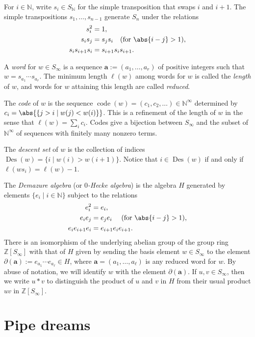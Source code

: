 \documentclass[11pt,reqno]{amsart} %
\newcommand{\bbN}{\mathbb{N}}
\newcommand{\bbZ}{\mathbb{Z}}
\DeclareMathOperator{\code}{code}
\DeclareMathOperator{\Des}{Des}
\theoremstyle{definition}
\begin{document}
For $i\in \bbN$, write $s_i\in S_\bbN$ for the simple transposition that swaps $i$ and $i+1$.
The simple transpositions $s_1,\dots,s_{n-1}$ generate $S_n$ under the relations \begin{align*}
    s_i^2 &= 1, \\
    s_is_j &= s_js_i
    \quad\text{(for $\abs{i-j}>1$)},
    \\
    s_is_{i+1}s_i &= s_{i+1}s_is_{i+1}.
\end{align*}

A \textit{word} for $w\in S_\infty$ is a sequence $\mathbf a := (a_1,\dots,a_r)$ of positive integers such that $w = s_{a_1}\cdots s_{a_r}$.
The minimum length $\ell(w)$ among words for $w$ is called the \textit{length} of $w$, and words for $w$ attaining this length are called \textit{reduced}.

The \textit{code} of $w$ is the sequence $\code(w) = (c_1,c_2,\dots)\in \bbN^\infty$ determined by $c_i = \abs{\{j> i \mid w(j) < w(i)\}}$.
This is a refinement of the length of $w$ in the sense that $\ell(w) = \sum_i c_i$.
Codes give a bijection between $S_\infty$ and the subset of $\bbN^\infty$ of sequences with finitely many nonzero terms.

The \textit{descent set} of $w$ is the collection of indices $\Des(w) = \{i \mid w(i) > w(i+1)\}$.
Notice that $i\in \Des(w)$ if and only if $\ell(ws_i) = \ell(w) - 1$.

The \textit{Demazure algebra} (or \textit{$0$-Hecke algebra}) is the algebra $H$ generated by elements $\{e_i \mid i\in\bbN\}$ subject to the relations \begin{align*}
    e_i^2 &= e_i, \\
    e_ie_j &= e_je_i
    \quad\text{ (for $\abs{i-j}>1$)},
    \\
    e_ie_{i+1}e_i
    &= e_{i+1}e_ie_{i+1}.
\end{align*}
There is an isomorphism of the underlying abelian group of the group ring $\bbZ[S_\infty]$ with that of $H$ given by sending the basis element $w\in S_\infty$ to the element $\partial(\mathbf a) := e_{a_1}\cdots e_{a_{\ell}}\in H$, where $\mathbf a = (a_1,\dots,a_{\ell})$ is any reduced word for $w$.
By abuse of notation, we will identify $w$ with the element $\partial(\mathbf a)$.
If $u,v\in S_\infty$, then we write $u*v$ to distinguish the product of $u$ and $v$ in $H$ from their usual product $uv$ in $\bbZ[S_\infty]$.


\section{Pipe dreams}
\label{sect:pipe dreams}
\end{document}
